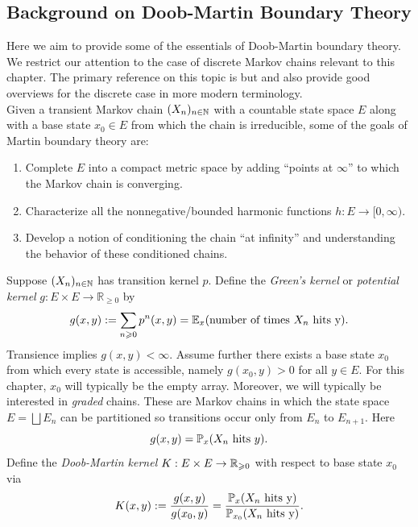 \begin{subappendices}
\section{Background on Doob-Martin Boundary Theory}
\label{appendix:doob_martin_background_appendix}
Here we aim to provide some of the essentials of Doob-Martin boundary theory.
We restrict our attention to the case of discrete Markov chains relevant to this
chapter. The primary reference on this topic is \citep{doob1959_discrete_potential_theory_boundaries} but
\citep{sawyer_martin_boundaries_random_walks} and \citep{evans2014_doob_martin_remy_tree_growth} also provide good overviews for the discrete
case in more modern terminology.\\

 Given a transient Markov chain $\Xn$ with a countable state space $E$ along with a base state $x_0 \in E$ from which the chain is irreducible, some of the goals of Martin boundary theory are:

\begin{enumerate}[label=(\roman*)]
    \item Complete $E$ into a compact metric space by adding ``points at $\infty$'' to which the Markov chain is converging.
    \item Characterize all the nonnegative/bounded harmonic functions $h :E \to [0,\infty)$.
    \item Develop a notion of conditioning the chain ``at infinity'' and understanding the behavior of these conditioned chains.
\end{enumerate}

%
\indent Suppose $\Xn$ has transition kernel $p$. Define the \textit{Green's kernel} or
\textit{potential kernel} $g: E \times E \to \mathbb{R}_{\geq0}$ by
%
\begin{equation}
    g(x,y) := \sum_{n \geq 0} p^n(x,y) = \E_x (\text{number of times $X_n$ hits y}).
    \label{eqn:green's_kernel}
\end{equation}
%
\noindent Transience implies $g(x,y) < \infty$. Assume further there exists a base state $x_0$ from which every state is
accessible, namely $g(x_0,y) > 0$ for all $y \in E$. For this chapter, $x_0$ will
typically be the empty array.
Moreover, we will typically be interested in \textit{graded} chains. These are
Markov chains in which the state space $E  =\bigsqcup E_n$ can be partitioned
so transitions occur only from $E_n$ to $E_{n+1}$. Here
%
    \[g(x,y) = \P_x(X_n \text{ hits }y).\]
%
\noindent Define the \textit{Doob-Martin kernel} $K:E \times E \to \R_{\geq 0}$
with respect to base state $x_0$ via
%
\begin{equation}
    K(x,y) := \frac{g(x,y)}{g(x_0,y)} = \frac{\P_x(X_n \text{ hits y})}{\P_{x_0}(X_n \text{ hits y})}.
\end{equation}


\end{subappendices}
